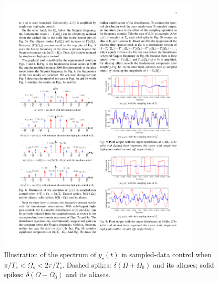 \documentclass [11pt, proquest] {uwthesis}[2020/02/24]
\begin{document}
\begin{figure}[!ht]
\begin{centering}
{\begin{centering}
\includegraphics[clip,width=10cm]{Spectral-analysis/FIG6d}
\par\end{centering}
}
\par\end{centering}
\caption{\label{fig:Illustration-of-the}Illustration of the spectrum of $y_{c}(t)$
in sampled-data control when $\pi/T_{s}<\Omega_{o}<2\pi/T_{s}$. Dashed
spikes: $\delta(\Omega+\Omega_{0})$ and its aliases; solid spikes:
$\delta(\Omega-\Omega_{0})$ and its aliases.}
\end{figure}
 
\end{document}

